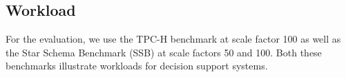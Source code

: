 
\subsection{Workload} \label{exp-workload}
For the evaluation, we use the TPC-H benchmark at scale factor 100 %
as well as the Star Schema Benchmark (SSB) at scale factors 50 and 100. %
Both these benchmarks illustrate workloads for decision support systems.


